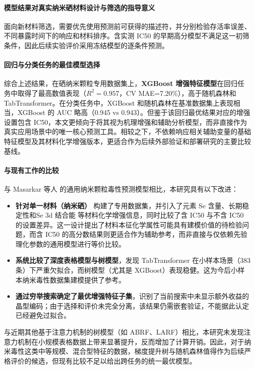 \documentclass[letterpaper]{article}
\begin{document}
\paragraph{模型结果对真实纳米硒材料设计与筛选的指导意义}
面向新材料筛选，需要优先使用预测前可获得的描述符，并分别检验存活率误差、不同暴露时间下的响应和材料排序。含实测 IC50 的早期高分模型不满足这一初筛条件，因此后续实验评价采用冻结模型的逐条件预测。

\paragraph{回归与分类任务的最佳模型选择}
综合上述结果，在硒纳米颗粒专用数据集上，\textbf{XGBoost 增强特征模型}在回归任务中取得了最高数值表现（$R^2=0.957$，CV MAE=7.20\%），高于随机森林和 TabTransformer。在分类任务中，XGBoost 和随机森林在基准数据集上表现相当，XGBoost 的 AUC 略高（0.945 vs 0.943）。但鉴于该回归最优结果对应的增强设置包含 IC50，本文更倾向于将其视为机理增强和辅助分析模型，而非直接作为真实应用场景中的唯一核心预测工具。相较之下，不依赖响应相关辅助变量的基础特征模型及其材料化学增强版本，更适合作为后续外部验证和部署研究的主要比较基线。

\paragraph{与现有工作的比较}
与 Masarkar 等人 \cite{masarkar2024} 的通用纳米颗粒毒性预测模型相比，本研究具有以下改进：
\begin{itemize}
  \item \textbf{针对单一材料（纳米硒）} 构建了专用数据集，并引入了元素 Se 含量、长期稳定性和Se 3d 结合能 等材料化学增强信息，同时比较了含 IC50 与不含 IC50 的设置差异。这一设计提出了材料本征化学属性可能具有建模价值的待检验问题，而含 IC50 的高分数结果则更适合作为辅助参考，而非直接与仅依赖先验理化参数的通用模型进行等价比较。
  \item \textbf{系统比较了深度表格模型与树模型}，发现 TabTransformer 在小样本场景（383 条）下严重欠拟合，而树模型（尤其是 XGBoost）表现稳健。这为今后小样本纳米毒性数据集建模提供了参考。
  \item \textbf{通过穷举搜索确定了最优增强特征子集}，识别了当前搜索中未显示额外收益的晶型编码；由于选择和评价未完全分离，该结果仍需嵌套验证，不能据此认定已经避免过拟合。
\end{itemize}
与近期其他基于注意力机制的树模型（如 ABRF、LARF）相比，本研究未发现注意力机制在小规模表格数据上带来显著提升，反而增加了计算开销。因此，对于纳米毒性这类中等规模、混合型特征的数据，梯度提升树与随机森林值得作为后续严格评价的候选，但现有比较不足以给出跨任务的统一最优模型。
\end{document}
